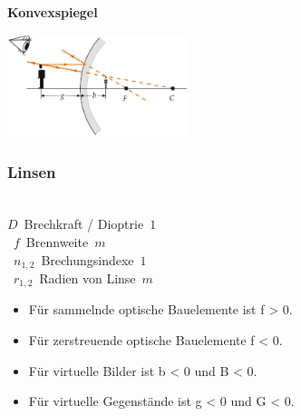 \textbf{Konvexspiegel}
\begin{center}
	\includegraphics[height=3cm,keepaspectratio=true]{Images/konvexspiegel.png}
\end{center}

\subsubsection{Linsen}

\begin{center}
	\begin{minipage}{0.2\textwidth}
		 \\
		
		\unit{$ D $}{Brechkraft / Dioptrie}{$1$} \\
		\unit{$ f $}{Brennweite}{$m$} \\
		\unit{$ n_{1,2} $}{Brechungsindexe}{$1$} \\
		\unit{$ r_{1,2} $}{Radien von Linse}{$m$} \\
	\end{minipage}%
	\begin{minipage}{0.4\textwidth}
		\begin{itemize}
			\setlength\itemsep{-0.5 em}
			\item Für sammelnde optische Bauelemente ist f > 0.
			\item Für zerstreuende optische Bauelemente f < 0.
			\item Für virtuelle Bilder ist b < 0 und B < 0.
			\item Für virtuelle Gegenstände ist g <	0 und G < 0.
		\end{itemize}
	\end{minipage}
\end{center}

